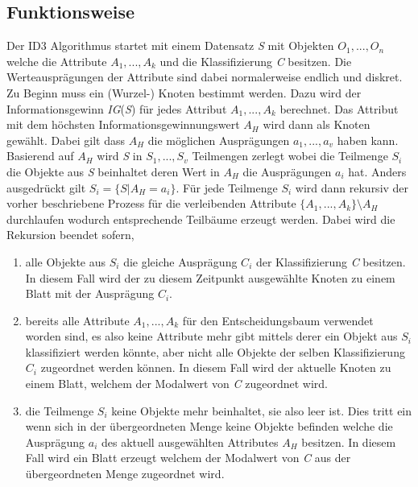 \subsection{Funktionsweise}
Der ID3 Algorithmus startet mit einem Datensatz \textit{S} mit Objekten $O_{1},...,O_{n}$ welche die Attribute $A_{1},...,A_{k}$ und die Klassifizierung \textit{C} besitzen. \autocites{ImplementationID3}{QuinlanID3} Die Werteausprägungen der Attribute sind dabei normalerweise endlich und diskret. \autocite{ThailandID3}\\
Zu Beginn muss ein (Wurzel-) Knoten bestimmt werden. Dazu wird der Informationsgewinn \textit{IG}(\textit{S}) für jedes Attribut $A_{1},...,A_{k}$ berechnet. Das Attribut mit dem höchsten Informationsgewinnungswert $A_{H}$ wird dann als Knoten gewählt. Dabei gilt dass $A_{H}$ die möglichen Ausprägungen $a_{1},...,a_{v}$ haben kann. Basierend auf $A_{H}$ wird \textit{S} in $S_{1},...,S_{v}$ Teilmengen zerlegt wobei die Teilmenge $S_{i}$ die Objekte aus \textit{S} beinhaltet deren Wert in $A_{H}$ die Ausprägungen $a_{i}$ hat. Anders ausgedrückt gilt $S_{i} = \{S\vert A_{H} = a_{i}\}$. Für jede Teilmenge $S_{i}$ wird dann rekursiv der vorher beschriebene Prozess für die verleibenden Attribute $\{A_{1},...,A_{k}\}\setminus A_{H}$ durchlaufen wodurch entsprechende Teilbäume erzeugt werden. \Autocite{QuinlanID3} Dabei wird die Rekursion beendet sofern,

\begin{enumerate}
    \item alle Objekte aus $S_{i}$ die gleiche Ausprägung $C_{i}$ der Klassifizierung \textit{C} besitzen. In diesem Fall wird der zu diesem Zeitpunkt ausgewählte Knoten zu einem Blatt mit der Ausprägung $C_{i}$. \autocites{QuinlanID3}{ID3algor15:online}
    \item bereits alle Attribute $A_{1},...,A_{k}$ für den Entscheidungsbaum verwendet worden sind, es also keine Attribute mehr gibt mittels derer ein Objekt aus $S_{i}$ klassifiziert werden könnte, aber nicht alle Objekte der selben Klassifizierung $C_{i}$ zugeordnet werden können. In diesem Fall wird der aktuelle Knoten zu einem Blatt, welchem der Modalwert von \textit{C} zugeordnet wird.\autocites{QuinlanID3}{ID3algor15:online}
    \item die Teilmenge $S_{i}$ keine Objekte mehr beinhaltet, sie also leer ist. Dies tritt ein wenn sich in der übergeordneten Menge keine Objekte befinden welche die Ausprägung $a_{i}$ des aktuell ausgewählten Attributes $A_{H}$ besitzen. In diesem Fall wird ein Blatt erzeugt welchem der Modalwert von \textit{C} aus der übergeordneten Menge zugeordnet wird. \autocite{ID3algor15:online}
\end{enumerate}

\pagebreak